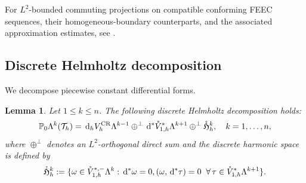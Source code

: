 \documentclass[10pt]{amsart}
\numberwithin{equation}{section}
\newtheorem{lemma}[theorem]{Lemma}
\newcommand{\dd}{\,{\rm d}}
\begin{document}
For $L^2$-bounded commuting projections on compatible conforming FEEC
sequences, their homogeneous-boundary counterparts, and the associated
approximation estimates, see \cite{ArnoldGuzman2021,ChristiansenWinther2008}.

\subsection{Discrete Helmholtz decomposition}
We decompose piecewise constant differential forms.

\begin{lemma}\label{lem:discreteHelmholtz}
Let $1\leq k\leq n$.
The following discrete Helmholtz decomposition holds:
\begin{equation}\label{eq:discreteL2HelmholtzDecompCRL} 
\mathbb P_0\Lambda^k(\mathcal T_h)=\dd_h V_h^{\rm CR}\Lambda^{k-1} \oplus^{\perp} \dd^*\mathring{V}_{1,h}^{*}\Lambda^{k+1} \oplus^{\perp} \mathring{\mathfrak{H}}_h^k, \quad k=1,\ldots, n,
\end{equation}
where $\oplus^{\perp}$ denotes an $L^2$-orthogonal direct sum and the
discrete harmonic space is defined by
\begin{equation*}
\mathring{\mathfrak{H}}_h^k:=\{\omega\in\mathring{V}_{1,h}^{*,-}\Lambda^{k}: \dd^*\omega=0, (\omega,\dd^*\tau)=0\;\;\forall\,\tau\in\mathring{V}_{1,h}^{*}\Lambda^{k+1}\}.
\end{equation*}
\end{lemma}
\end{document}

